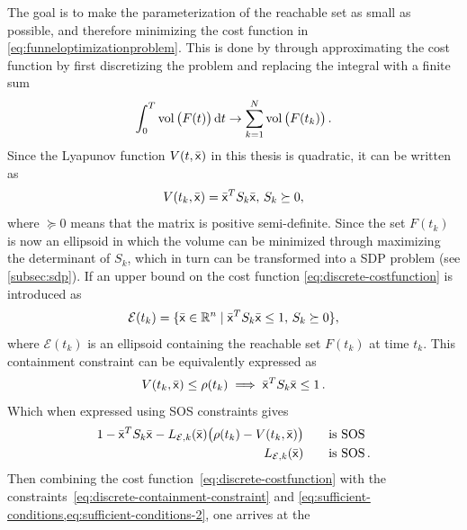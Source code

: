 The goal is to make the parameterization of the reachable set as small as
possible, and therefore minimizing the cost function in
\cref{eq:funneloptimizationproblem}. This is done by \textcite{Tobenkin_2011}
through approximating the cost function by first discretizing the problem and
replacing the integral with a finite sum
\begin{equation}
  \int_{0}^{T} \operatorname{vol}\big( F(t) \big) \, \mathrm{d}t \rightarrow \sum_{k=1}^{N} \operatorname{vol}\big( F(t_{k}) \big) \, . \label{eq:discrete-costfunction}
\end{equation}
Since the Lyapunov function \(V(t,\bar{{\mathbf{\mathsf{x}}}})\) in this thesis is quadratic,
it can be written as
\begin{equation}
  V(t_{k}, \bar{{\mathbf{\mathsf{x}}}}) = {\bar{{\mathbf{\mathsf{x}}}}}^{T}S_{k}\bar{{\mathbf{\mathsf{x}}}}, \, S_{k} \succeq 0,
\end{equation}
where \(\succeq 0\) means that the matrix is positive semi-definite. Since the
set \(F(t_{k})\) is now an ellipsoid in which the volume can be minimized
through maximizing the determinant of \(S_{k}\), which in turn can be
transformed into a \acl{SDP} problem (see \cref{subsec:sdp}). If an upper bound
on the cost function \cref{eq:discrete-costfunction} is introduced as
\begin{equation}
  \mathcal{E} (t_{k}) = \lbrace\bar{{\mathbf{\mathsf{x}}}} \in \mathbb{R}^n \mid {\bar{{\mathbf{\mathsf{x}}}}}^{T}S_{k}\bar{{\mathbf{\mathsf{x}}}} \leq 1, \, S_{k} \succeq 0\rbrace,
\end{equation}
where \( \mathcal{E} ( t_{k} ) \) is an ellipsoid containing the reachable set
\( F ( t_{k} ) \) at time \( t_{k} \). This containment constraint can be
equivalently expressed as
\begin{equation}
  V ( t_{k}, \bar{{\mathbf{\mathsf{x}}}} ) \leq \rho(t_{k})  \implies {\bar{{\mathbf{\mathsf{x}}}}}^{T}S_{k}\bar{{\mathbf{\mathsf{x}}}} \leq 1 \, .
  \label{eq:discrete-containment-constraint}
\end{equation}
Which when expressed using \ac{SOS} constraints gives
\begin{align}
  1 - {\bar{{\mathbf{\mathsf{x}}}}}^{T}S_{k}\bar{{\mathbf{\mathsf{x}}}} - L_{\mathcal{E},k}(\bar{{\mathbf{\mathsf{x}}}}) \big( \rho(t_{k}) - V(t_{k}, \bar{{\mathbf{\mathsf{x}}}}) \big)  \qquad \text{is SOS}& \\
  L_{\mathcal{E},k}(\bar{{\mathbf{\mathsf{x}}}}) \qquad \text{is SOS}& \, . \nonumber
\end{align}
%
Then combining the cost function~\eqref{eq:discrete-costfunction} with the
constraints~\eqref{eq:discrete-containment-constraint} and
\cref{eq:sufficient-conditions,eq:sufficient-conditions-2}, one arrives at the
